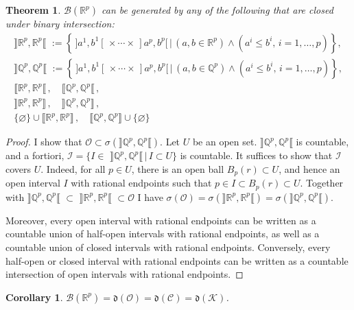 \documentclass[11pt, a4paper, openany]{book}
\newtheorem{thm}{Theorem}\newtheorem{lem}{Lemma}\newtheorem{crl}{Corollary}
\theoremstyle{definition}
\begin{document}
    \begin{thm}
        $\mathscr{B}(\mathbb{R}^p)$ can be generated by any of the following that are closed under binary intersection:
        \begin{gather*}
            \rrbracket \mathbb{R}^p,\mathbb{R}^p\llbracket\,\,:=\left\{%
            \, ]a^1,b^1[\,\times\cdots\times\,]a^p,b^p[\,\big|\,(a,b\in\mathbb{R}^p)\wedge(a^i\leqslant b^i, \,i=1,\dots,p)\right\},\\
            \rrbracket \mathbb{Q}^p,\mathbb{Q}^p\llbracket\,\,:=\left\{%
            \, ]a^1,b^1[\,\times\cdots\times\,]a^p,b^p[\,\big|\,(a,b\in\mathbb{Q}^p)\wedge(a^i\leqslant b^i, \,i=1,\dots,p)\right\},\\
            \llbracket \mathbb{R}^p,\mathbb{R}^p\llbracket\,,\quad \llbracket \mathbb{Q}^p,\mathbb{Q}^p\llbracket\,,\\
            \rrbracket \mathbb{R}^p,\mathbb{R}^p\rrbracket\,,\quad \rrbracket \mathbb{Q}^p,\mathbb{Q}^p\rrbracket\,,\\
            \{\varnothing\}\cup\llbracket \mathbb{R}^p,\mathbb{R}^p\rrbracket\,,\quad \llbracket \mathbb{Q}^p,\mathbb{Q}^p\rrbracket\cup\{\varnothing\}\,\,
        \end{gather*}
    \end{thm}
    \begin{proof}
        I show that $\mathscr{O}\subset\sigma(\rrbracket \mathbb{Q}^p,\mathbb{Q}^p\llbracket)$. Let $U$ be an open set. $\rrbracket \mathbb{Q}^p,\mathbb{Q}^p\llbracket$ is countable, and a fortiori, $\mathscr{I}=\{I\in\,\,\rrbracket \mathbb{Q}^p,\mathbb{Q}^p\llbracket\,|\, I\subset U\}$ is countable. It suffices to show that $\mathscr{I}$ covers $U$. Indeed, for all $p\in U$, there is an open ball $B_p(r)\subset U$, and hence an open interval $I$ with rational endpoints such that $p\in I\subset B_p(r)\subset U$. Together with $\rrbracket \mathbb{Q}^p,\mathbb{Q}^p\llbracket\,\,\subset\,\,\rrbracket \mathbb{R}^p,\mathbb{R}^p\llbracket\,\,\subset \mathscr{O}$ I have $\sigma(\mathscr{O})=\sigma(\rrbracket \mathbb{R}^p,\mathbb{R}^p\llbracket)=\sigma(\rrbracket \mathbb{Q}^p,\mathbb{Q}^p\llbracket)$.
        
        Moreover, every open interval with rational endpoints can be written as a countable union of half-open  intervals with rational endpoints, as well as a countable union of closed intervals with rational endpoints. Conversely, every half-open or closed interval with rational endpoints can be written as a countable intersection of open intervals with rational endpoints.
    \end{proof}
    \begin{crl}
        $\mathscr{B}(\mathbb{R}^p)=\mathfrak{d}(\mathscr{O})=\mathfrak{d}(\mathscr{C})=\mathfrak{d}(\mathscr{K})$.
    \end{crl}
\end{document}
